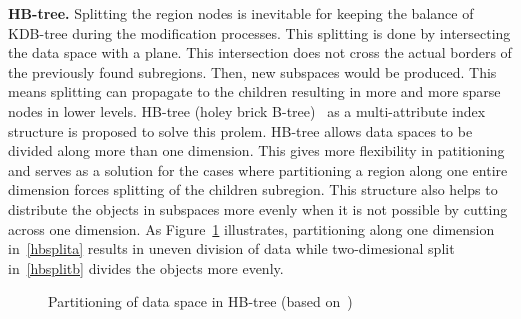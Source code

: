 \documentclass[a4paper,12pt]{article}
\begin{document}
\textbf{HB-tree.} 
Splitting the region nodes is inevitable for keeping the balance of KDB-tree during the modification processes. This splitting is done by intersecting the data space with a plane. This intersection does not cross the actual borders of the previously found subregions. Then, new subspaces would be produced. This means splitting can propagate to the children resulting in more and more sparse nodes in lower levels. HB-tree (holey brick B-tree)~\cite{hbtree1} as a multi-attribute index structure is proposed to solve this prolem. HB-tree allows data spaces to be divided along more than one dimension. 
This gives more flexibility in patitioning and serves as a solution for the cases where partitioning a region along one entire dimension forces splitting of the children subregion. This structure also helps to distribute the objects in subspaces more evenly when it is not possible by cutting across one dimension. As Figure~\ref{hbtree} illustrates, partitioning along one dimension in~\ref{hbsplita} results in uneven division of data while two-dimesional split in~\ref{hbsplitb} divides the objects more evenly.

\begin{figure}
\centering
{}
\centering
{}
\caption{Partitioning of data space in HB-tree (based on~\cite{tree-basedindexes})}
\label{hbtree}
\end{figure}
\end{document}
